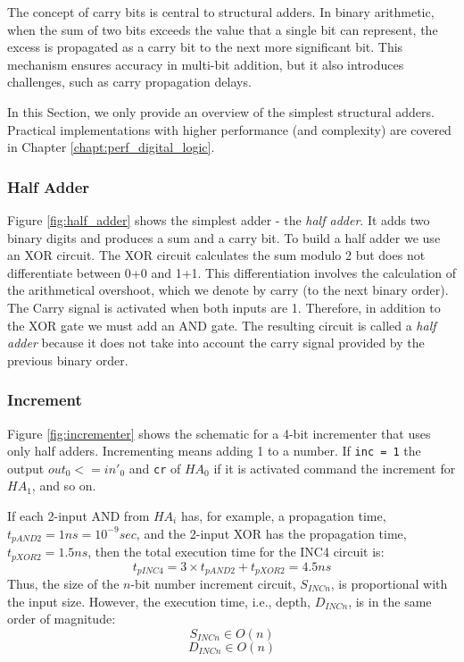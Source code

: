 The concept of carry bits is central to structural adders. In binary arithmetic, when the sum of two bits exceeds the value that a single bit can represent, the excess is propagated as a carry bit to the next more significant bit. This mechanism ensures accuracy in multi-bit addition, but it also introduces challenges, such as carry propagation delays. 

In this Section, we only provide an overview of the simplest structural adders. Practical implementations with higher performance (and complexity) are covered in Chapter \ref{chapt:perf_digital_logic}.

\subsubsection{Half Adder}

Figure \ref{fig:half_adder} shows the simplest adder - the \textit{half adder}. It adds two binary digits and produces a sum and a carry bit. To build a half adder we use an XOR circuit. The XOR circuit calculates the sum modulo 2 but does not differentiate between 0+0 and 1+1. This differentiation involves the calculation of the arithmetical overshoot, which we denote by carry (to the next binary order). The Carry signal is activated when both inputs are 1. Therefore, in addition to the XOR gate we must add an AND gate. The resulting circuit is called a \textit{half adder} because it does not take into account the carry signal provided by the previous binary order.

\subsubsection{Increment}

Figure \ref{fig:incrementer} shows the schematic for a 4-bit incrementer that uses only half adders. Incrementing means adding 1 to a number. If {\tt inc = 1} the output $out_0 <= in'_0$  and {\tt cr} of $HA_0$ if it is activated command the increment for $HA_1$, and so on.

If each 2-input AND from $HA_i$ has, for example,  a propagation time, $t_{pAND2} = 1ns = 10^{-9}sec$, and the 2-input XOR has the propagation time, $t_{pXOR2} = 1.5ns$, then the total execution time for the INC4 circuit is:
$$t_{pINC4} = 3 \times t_{pAND2} + t_{pXOR2} = 4.5ns$$
Thus, the size of the $n$-bit number increment circuit, $S_{INCn}$, is proportional with the input size. However, the execution time, i.e., depth, $D_{INCn}$, is in the same order of magnitude:
$$S_{INCn} \in O(n)$$
$$D_{INCn} \in O(n)$$

